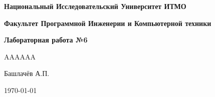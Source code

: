 \begin{titlepage}
    \centering 
    \vspace{2cm} 
    {\LARGE  \bfseries Национальный Исследовательский Университет ИТМО \par}
    \vspace{2cm}
    {\LARGE  \bfseries Факультет Программной Инженерии и Компьютерной техники \par}
    \vspace{4cm}
    {\Huge \bfseries Лабораторная работа №6\par} 
    \vspace{2cm}
    \utya
    \renewcommand{\utya}{AAAAAA}
    \utya
    \vspace{2cm}\par
    {\large Башлачёв А.П.\par} 
    \vspace{1.5cm}
    {\large\today\par}
    \vfill 
\end{titlepage}
